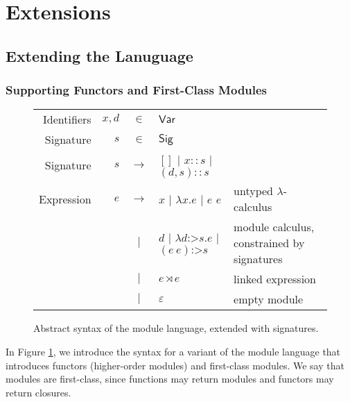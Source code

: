 \documentclass[acmsmall,screen,review]{acmart}\settopmatter{printfolios=true,printccs=false,printacmref=false}
\theoremstyle{acmdefinition}
\newcommand*{\vbar}{|}
\newcommand*{\cons}{::}
\newcommand*{\ExprVar}{\mathsf{Var}}
\newcommand*{\modid}{d}
\newcommand*{\Sig}{\mathsf{Sig}}
\newcommand*{\link}[2]{{#1}\rtimes{#2}}
\newcommand*{\project}{\text{{:>}}}
\begin{document}
\section{Extensions}
\subsection{Extending the Lanuguage}
\subsubsection{Supporting Functors and First-Class Modules}
\begin{figure}[h!]
  \footnotesize
  \centering
  \begin{tabular}{rrcll}
    Identifiers & $x,\modid$ & $\in$         & $\ExprVar$                                                                                                           \\
    Signature   & $s$        & $\in$         & $\Sig$                                                                                                               \\
    Signature   & $s$        & $\rightarrow$ & $[]$ $\vbar$ $x\cons s$ $\vbar$ $(\modid,s)\cons s$                                                                  \\
    Expression  & $e$        & $\rightarrow$ & $x$ $\vbar$ $\lambda x.e$ $\vbar$ $e$ $e$                               & untyped $\lambda$-calculus                 \\
                &            & $\vbar$       & $\modid$ $\vbar$ $\lambda\modid\project s.e$ $\vbar$ $(e\:e)\project s$ & module calculus, constrained by signatures \\
                &            & $\vbar$       & $\link{e}{e}$                                                           & linked expression                          \\
                &            & $\vbar$       & $\varepsilon$                                                           & empty module
  \end{tabular}
  \caption{Abstract syntax of the module language, extended with signatures.}
  \label{fig:extsyntax}
\end{figure}
In Figure \ref{fig:extsyntax}, we introduce the syntax for a variant of the module language that introduces functors (higher-order modules) and first-class modules.
We say that modules are first-class, since functions may return modules and functors may return closures.
\end{document}
